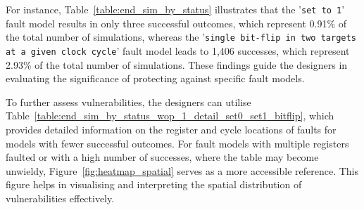For instance, Table~\ref{table:end_sim_by_status} illustrates that the '\texttt{set to 1}' fault model results in only three successful outcomes, which represent 0.91\% of the total number of simulations, whereas the '\texttt{single bit-flip in two targets at a given clock cycle}' fault model leads to 1,406 successes, which represent 2.93\% of the total number of simulations. These findings guide the designers in evaluating the significance of protecting against specific fault models.

To further assess vulnerabilities, the designers can utilise Table~\ref{table:end_sim_by_status_wop_1_detail_set0_set1_bitflip}, which provides detailed information on the register and cycle locations of faults for models with fewer successful outcomes. For fault models with multiple registers faulted or with a high number of successes, where the table may become unwieldy, Figure~\ref{fig:heatmap_spatial} serves as a more accessible reference. This figure helps in visualising and interpreting the spatial distribution of vulnerabilities effectively.

